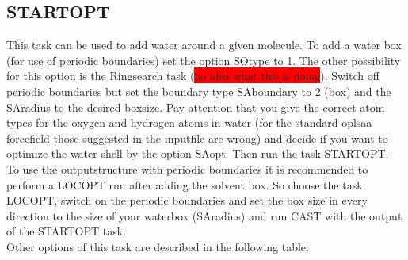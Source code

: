 \documentclass[10pt,a4paper]{article} %
\begin{document}
	\subsection{STARTOPT}	
	
	This task can be used to add water around a given molecule. To add a water box (for use of periodic boundaries) set the option SOtype to 1. The other possibility for this option is the Ringsearch task (\colorbox{red}{no idea what this is doing}). Switch off periodic boundaries but set the boundary type SAboundary to 2 (box) and the SAradius to the desired boxsize. Pay attention that you give the correct atom types for the oxygen and hydrogen atoms in water (for the standard oplsaa forcefield those suggested in the inputfile are wrong) and decide if you want to optimize the water shell by the option SAopt. Then run the task STARTOPT.\\
	
	To use the outputstructure with periodic boundaries it is recommended to perform a LOCOPT run after adding the solvent box. So choose the task LOCOPT, switch on the periodic boundaries and set the box size in every direction to the size of your waterbox (SAradius) and run \ac{CAST} with the output of the STARTOPT task.\\
	
	Other options of this task are described in the following table:
	
\end{document}
